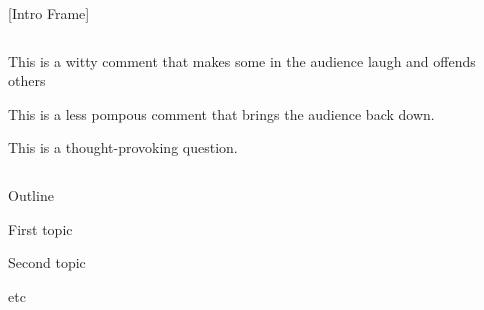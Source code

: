 \documentclass[notes,11pt, aspectratio=169]{beamer}
\newenvironment{wideitemize}{\itemize\addtolength{\itemsep}{10pt}}{\enditemize}
\begin{document}
\begin{frame}{[Intro Frame]}
\begin{columns}[T] %
\begin{column}{.58\textwidth}
  \begin{wideitemize}
    \item This is a witty comment that makes some in the audience laugh and offends others
    \item This is a less pompous comment that brings the audience back down.
    \item This is a thought-provoking question.
  \end{wideitemize}
\end{column}%
\hfill%
\begin{column}{.38\textwidth}
\end{column}%
\end{columns}
\end{frame}

\begin{frame}{Outline}
  \begin{wideitemize}
    \item First topic
    \item Second topic
    \item etc
  \end{wideitemize}
\end{frame}
\end{document}
